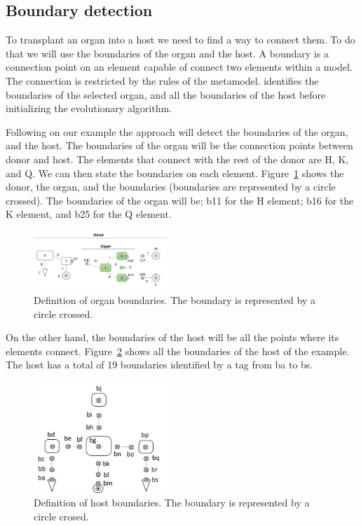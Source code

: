 \subsection{Boundary detection}

To transplant an organ into a host we need to find a way to connect them. To do that we will use the boundaries of the organ and the host. A boundary is a connection point on an element capable of connect two elements within a model. The connection is restricted by the rules of the metamodel. \ApproachName{} identifies the boundaries of the selected organ, and all the boundaries of the host before initializing the evolutionary algorithm.

Following on our example the approach will detect the boundaries of the organ, and the host. The boundaries of the organ will be the connection points between donor and host. The elements that connect with the rest of the donor are H, K, and Q. We can then state the boundaries on each element. Figure~\ref{fig:org_bound} shows the donor, the organ, and the boundaries (boundaries are represented by a circle crossed). The boundaries of the organ will be; b11 for the H element; b16 for the K element, and b25 for the Q element.

\begin{figure}[h]
    \centering
    \includegraphics[width=0.45\textwidth]{Figures/donor+organ_boundaries.png}
    \caption{Definition of organ boundaries. The boundary is represented by a circle crossed.}
    \label{fig:org_bound}
\end{figure}

On the other hand, the boundaries of the host will be all the points where its elements connect. Figure~\ref{fig:host_bound} shows all the boundaries of the host of the example. The host has a total of 19 boundaries identified by a tag from ba to bs.

\begin{figure}[h]
    \centering
    \includegraphics[width=0.45\textwidth]{Figures/host_boundaries.png}
    \caption{Definition of host boundaries. The boundary is represented by a circle crosed.}
    \label{fig:host_bound}
\end{figure}

